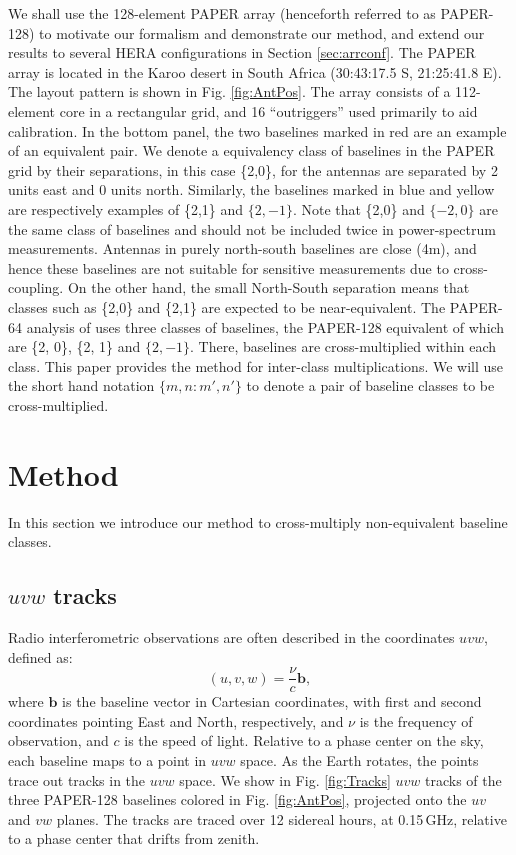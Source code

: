 \documentclass[twocolumn,apj,numberedappendix]{emulateapj}
\renewcommand\[{\begin{equation}}
\renewcommand\]{\end{equation}}
\begin{document}
We shall use the 128-element PAPER array (henceforth referred to as PAPER-128) to motivate our formalism and demonstrate our method, and extend our results to several HERA configurations in Section \ref{sec:arrconf}. 
The PAPER array is located in the Karoo desert in South Africa (30:43:17.5
S, 21:25:41.8 E). The layout pattern is shown
in Fig. \ref{fig:AntPos}. The array consists of a 112-element core in a rectangular grid, and 16 ``outriggers'' used primarily to aid calibration.  In the bottom panel, the two baselines marked in red are an example of an equivalent pair. We denote a equivalency class of baselines in the PAPER grid by their separations, in this case  \{2,0\}, for the
antennas are separated by 2 units east and 0 units north. Similarly,
the baselines marked in blue and yellow are respectively examples
of \{2,1\} and $\{2, -1\}$.
Note that \{2,0\} and $\{-2, 0\}$ are the same class of baselines and should not be included twice in power-spectrum measurements. Antennas in purely north-south baselines
are close (4m), and hence these baselines are not suitable
for sensitive measurements due to cross-coupling. On the other hand, the small North-South separation means that classes such as \{2,0\} and  \{2,1\} are expected to be near-equivalent. The PAPER-64 analysis of \cite{Ali2015} uses three classes of baselines, the PAPER-128
equivalent of which are 
\{2, 0\}, \{2, 1\} and $\{2, -1\}$. There, baselines are cross-multiplied within each class. This paper provides the method for inter-class multiplications. We will use the short hand notation $\{m,n:m',n'\}$ to denote a pair of baseline classes to be cross-multiplied. 


\section{Method \label{sec:method}}\label{sec:method}

In this section we introduce our method to cross-multiply non-equivalent baseline classes. 

\subsection{$uvw$ tracks \label{sec:tracks}}


Radio interferometric observations are often described in the coordinates $uvw$, defined as:
\[
(u, v, w) = \frac{\nu}{c}\boldsymbol{b}, 
\]
where $\boldsymbol{b}$ is the baseline vector in Cartesian coordinates, with first and second coordinates pointing East and North, respectively, and  $\nu$ is the frequency of observation, and $c$ is the speed of light. 
Relative to a phase center on the sky, each baseline maps to a point in $uvw$ space. As the Earth rotates, the points trace out tracks in the $uvw$ space. 
We show in Fig. \ref{fig:Tracks} $uvw$ tracks of the three PAPER-128 baselines colored in Fig. \ref{fig:AntPos}, projected onto the $uv$ and $vw$ planes. The tracks are traced over 12 sidereal hours, at 0.15\,GHz, relative to a phase center that drifts from zenith. 
\end{document}
